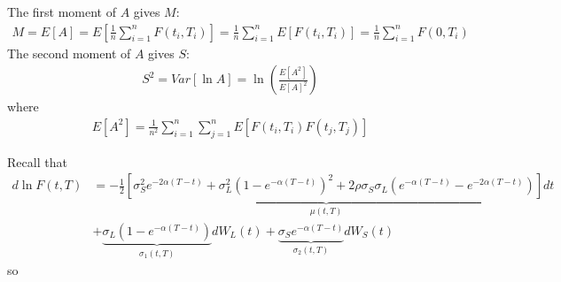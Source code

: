 \documentclass[12pt,a4paper,hidelinks,fleqn]{article}            %
\begin{document}
The first moment of $A$ gives $M$:
\begin{align*}
M = E[A] = E[\frac{1}{n}\sum_{i=1}^n F(t_i, T_i)] = \frac{1}{n}\sum_{i=1}^n E[F(t_i, T_i)] = \frac{1}{n} \sum_{i=1}^n F(0, T_i)
\end{align*}
The second moment of $A$ gives $S$:
\begin{align*}
S^2 = Var[\ln A] = \ln \left( \frac{E[A^2]}{E[A]^2} \right)
\end{align*}
where
\begin{align}
E[A^2] = \frac{1}{n^2}\sum_{i=1}^n \sum_{j=1}^n E[F(t_i, T_i) F(t_j, T_j)] 
\label{eq:sec-moment}
\end{align}

Recall that
\begin{align*}
d \ln F(t, T) & = \underbrace{- \frac{1}{2}[ \sigma_S^2 e^{-2\alpha(T-t)} + \sigma_L^2(1-e^{-\alpha(T-t)})^2  + 2 \rho \sigma_S \sigma_L \left(e^{-\alpha(T-t)} - e^{-2\alpha(T-t)}\right)]}_{\mu(t, T)} dt\\
              & + \underbrace{\sigma_L(1-e^{-\alpha(T-t)})}_{\sigma_1(t, T)} dW_L(t) 
                + \underbrace{\sigma_S e^{-\alpha(T-t)}}_{\sigma_2(t, T)} dW_S(t)
\end{align*}
so
\end{document}

